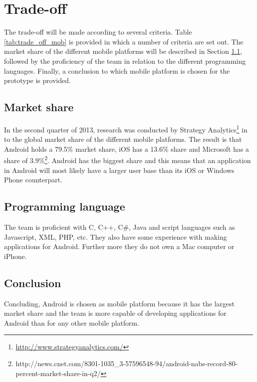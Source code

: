 \section{Trade-off}
\label{sec:trade_off_mobplat}
The trade-off will be made according to several criteria. Table \ref{tab:trade_off_mob} is provided in which a number of criteria are set out. The market share of the different mobile platforms will be described in Section \ref{sec:mark_share}, followed by the proficiency of the team in relation to the different programming languages. Finally, a conclusion to which mobile platform is chosen for the prototype is provided.

\subsection{Market share}
\label{sec:mark_share}
In the second quarter of 2013, research was conducted by Strategy Analytics\footnote{\url{http://www.strategyanalytics.com/}} in to the global market share of the different mobile platforms. The result is that Android holds a 79.5\% market share, iOS has a 13.6\% share and Microsoft has a share of 3.9\%\footnote{http://news.cnet.com/8301-1035\_3-57596548-94/android-nabs-record-80-percent-market-share-in-q2/}.  Android has the biggest share and this means that an application in Android will most likely have a larger user base than its iOS or Windows Phone counterpart.

\subsection{Programming language}
The team is proficient with C, C++, C\#, Java and script languages such as Javascript, XML, PHP, etc. They also have some experience with making applications for Android. Further more they do not own a Mac computer or iPhone. 

\subsection{Conclusion}
Concluding, Android is chosen as mobile platform because it has the largest market share and the team is more capable of developing applications for Android than for any other mobile platform.


